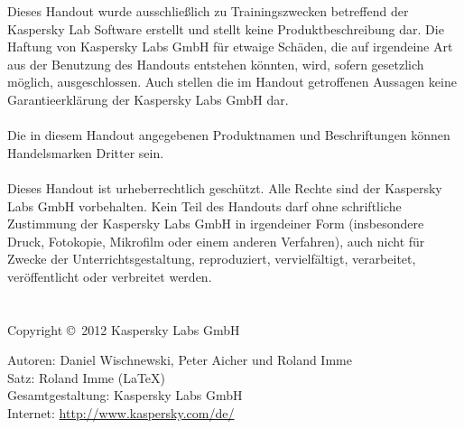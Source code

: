 Dieses Handout wurde ausschließlich zu Trainingszwecken betreffend der Kaspersky
Lab Software erstellt und stellt keine Produktbeschreibung dar. Die Haftung von
Kaspersky Labs GmbH für etwaige Schäden, die auf irgendeine Art aus der
Benutzung des Handouts entstehen könnten, wird, sofern gesetzlich möglich,
ausgeschlossen. Auch stellen die im Handout getroffenen Aussagen keine
Garantieerklärung der Kaspersky Labs GmbH dar.\\
\\
Die in diesem Handout angegebenen Produktnamen und Beschriftungen können
Handelsmarken Dritter sein.\\
\\
Dieses Handout ist urheberrechtlich geschützt. Alle Rechte sind der Kaspersky
Labs GmbH vorbehalten. Kein Teil des Handouts darf ohne schriftliche Zustimmung
der Kaspersky Labs GmbH in irgendeiner Form (insbesondere Druck, Fotokopie,
Mikrofilm oder einem anderen Verfahren), auch nicht für Zwecke der
Unterrichtsgestaltung, reproduziert, vervielfältigt, verarbeitet, veröffentlicht
oder verbreitet werden.\\
\\
\\
Copyright \copyright \ 2012 Kaspersky Labs GmbH



\vspace*{8cm}
Autoren: Daniel Wischnewski, Peter Aicher und Roland Imme\\
Satz: Roland Imme (\LaTeX)\\
Gesamtgestaltung: Kaspersky Labs GmbH\\


Internet: \url{http://www.kaspersky.com/de/}
